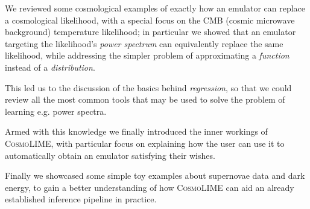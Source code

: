 We reviewed some cosmological examples of exactly how an emulator can replace a cosmological likelihood, with a special focus on the CMB (cosmic microwave background) temperature likelihood; in particular we showed that an emulator targeting the likelihood's \emph{power spectrum} can equivalently replace the same likelihood, while addressing the simpler problem of approximating a \emph{function} instead of a \emph{distribution}.

This led us to the discussion of the basics behind \emph{regression}, so that we could review all the most common tools that may be used to solve the problem of learning e.g. power spectra.

Armed with this knowledge we finally introduced the inner workings of \textsc{CosmoLIME}, with particular focus on explaining how the user can use it to automatically obtain an emulator satisfying their wishes.

Finally we showcased some simple toy examples about supernovae data and dark energy, to gain a better understanding of how \textsc{CosmoLIME} can aid an already established inference pipeline in practice.

